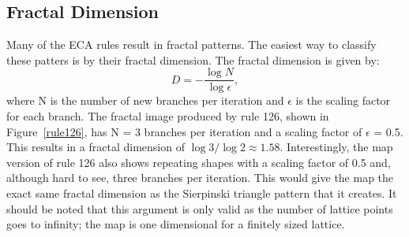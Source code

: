 \subsection{Fractal Dimension}

Many of the ECA rules result in fractal patterns.  The easiest way to classify these patters is by their fractal dimension.  The fractal dimension is given by:
\begin{equation}
	D = - \frac{\log N}{\log \epsilon},
\end{equation}
where N is the number of new branches per iteration and $\epsilon$ is the scaling factor for each branch.  The fractal image produced by rule 126, shown in Figure~\ref{rule126}, has N = 3 branches per iteration and a scaling factor of $\epsilon$ = 0.5.  This results in a fractal dimension of $\log 3/\log 2 \approx 1.58$.  Interestingly, the map version of rule 126 also shows repeating shapes with a scaling factor of 0.5 and, although hard to see, three branches per iteration.  This would give the map the exact same fractal dimension as the Sierpinski triangle pattern that it creates.  It should be noted that this argument is only valid as the number of lattice points goes to infinity; the map is one dimensional for a finitely sized lattice.  
